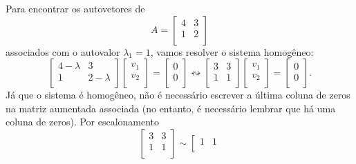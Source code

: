 \documentclass[../livro.tex]{subfiles}  %
\begin{document}
\begin{example}
	Para encontrar os autovetores de
	\begin{equation}
	A =
	\left[
	\begin{array}{cc}
	4 & 3 \\
	1 & 2 \\
	\end{array}
	\right]
	\end{equation} associados com o autovalor $\lambda_1 = 1$, vamos resolver o sistema homogêneo:
	\begin{equation}
	\left[
	\begin{array}{cc}
	4-\lambda & 3 \\
	1 & 2-\lambda \\
	\end{array}
	\right] \left[
	\begin{array}{c}
	v_1 \\
	v_2 \\
	\end{array}
	\right] = \left[
	\begin{array}{c}
	0 \\
	0 \\
	\end{array}
	\right] \leftrightsquigarrow
	\left[
	\begin{array}{cc}
	3 & 3 \\
	1 & 1 \\
	\end{array}
	\right] \left[
	\begin{array}{c}
	v_1 \\
	v_2 \\
	\end{array}
	\right] = \left[
	\begin{array}{c}
	0 \\
	0 \\
	\end{array}
	\right].
	\end{equation} Já que o sistema é homogêneo, não é necessário escrever a última coluna de zeros na matriz aumentada associada (no entanto, é necessário lembrar que há uma coluna de zeros). Por escalonamento
	\begin{equation}
	\left[
	\begin{array}{cc}
	3 & 3 \\
	1 & 1 \\
	\end{array}
	\right] \sim
	\left[
	\begin{array}{cc}
	1 & 1 \\

\end{array}
\end{equation}
\end{example}
\end{document}
